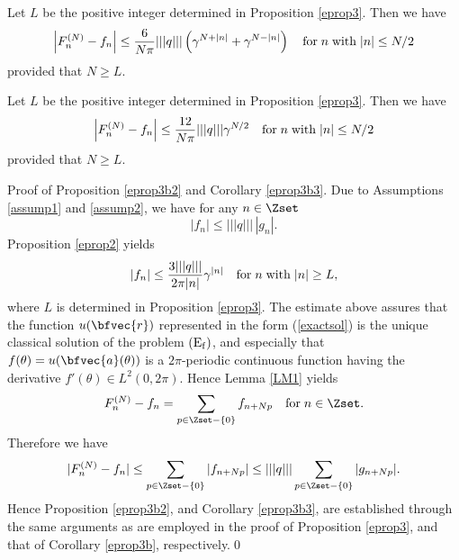 \begin{prop}
\label{eprop3b2}
Let $L$ be the positive integer determined in Proposition \ref{eprop3}. Then we have
\begin{eqnarray*}
\left|F^{(N)}_n-f_n\right| \le \displaystyle\frac{6}{N\pi}|||q|||\left(\gamma^{N+|n|}+\gamma^{N-|n|}\right) \quad {\rm for}\;n\;{\rm with}\; |n| \le N/2
\end{eqnarray*}
provided that $N \ge L$. 
\end{prop}
\begin{cor}
\label{eprop3b3}
Let $L$ be the positive integer determined in Proposition \ref{eprop3}. Then we have
\begin{eqnarray*}
\left|F^{(N)}_n-f_n\right| \le \displaystyle \frac{12}{N \pi}|||q|||\gamma^{N/2} \quad {\rm for}\;n\;{\rm with}\; |n| \le N/2
\end{eqnarray*}
provided that $N \ge L$. 
\end{cor}
\begin{pf}{Proof of Proposition \ref{eprop3b2} and Corollary \ref{eprop3b3}.} Due to Assumptions \ref{assump1} and \ref{assump2}, we have for any $n\in\Zset$
\begin{displaymath}
|f_n|\le |||q||| \, |g_n|.
\end{displaymath}
Proposition \ref{eprop2} yields 
\begin{displaymath}
|f_n| \le \frac{3|||q|||}{2\pi |n|}\gamma^{|n|} \quad {\rm for}\;n\;{\rm with}\;|n| \ge L,
\end{displaymath}
where $L$ is determined in Proposition \ref{eprop3}. The estimate above assures that the function $u(\bfvec{r})$ represented in the form (\ref{exactsol}) is the unique classical solution of the problem ${\rm (E_f)}$, and especially that $f(\theta)=u(\bfvec{a}(\theta))$ is a $2\pi$-periodic continuous function having the derivative $f'(\theta) \in L^2(0,2\pi)$. Hence Lemma \ref{LM1} yields
\begin{displaymath}
F^{(N)}_n-f_n=\sum_{p\in\Zset-\{0\}}f_{n+Np} \quad {\rm for}\;n\in\Zset.
\end{displaymath}
Therefore we have 
\begin{displaymath}
|F^{(N)}_n-f_n| \le \sum_{p\in\Zset-\{0\}}|f_{n+Np}| \le |||q||| \sum_{p\in\Zset-\{0\}}|g_{n+Np}|.
\end{displaymath}
Hence Proposition \ref{eprop3b2}, and Corollary \ref{eprop3b3}, are established through the same arguments as are employed in the proof of Proposition \ref{eprop3}, and that of Corollary \ref{eprop3b}, respectively.\qed
\end{pf}

